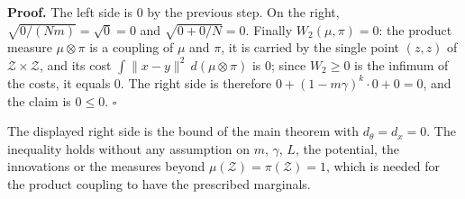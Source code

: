 \documentclass[11pt,a4paper]{report}
\begin{document}
\textbf{Proof.} The left side is \(0\) by the previous step. On the right, \(\sqrt{0/(Nm)}=\sqrt0=0\) and \(\sqrt{0+0/N}=0\). Finally \(W_2(\mu,\pi)=0\): the product measure \(\mu\otimes\pi\) is a coupling of \(\mu\) and \(\pi\), it is carried by the single point \((z,z)\) of \(\mathcal Z\times\mathcal Z\), and its cost \(\int\|x-y\|^2\,d(\mu\otimes\pi)\) is \(0\); since \(W_2\ge0\) is the infimum of the costs, it equals \(0\). The right side is therefore \(0+(1-m\gamma)^k\cdot0+0=0\), and the claim is \(0\le0\). \(\square\)




The displayed right side is the bound of the main theorem with \(d_\theta=d_x=0\). The inequality holds without any assumption on \(m\), \(\gamma\), \(L\), the potential, the innovations or the measures beyond \(\mu(\mathcal Z)=\pi(\mathcal Z)=1\), which is needed for the product coupling to have the prescribed marginals.
\end{document}
